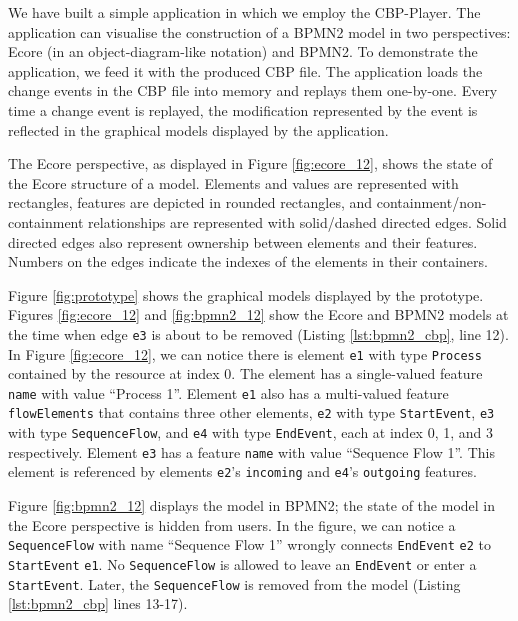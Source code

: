 \documentclass[conference]{IEEEtran}
\begin{document}
We have built a simple application in which we employ the CBP-Player. 
The application can visualise the construction of a BPMN2 model in two perspectives: Ecore (in an object-diagram-like notation) and BPMN2. 
To demonstrate the application, we feed it with the produced CBP file.
The application loads the change events in the CBP file into memory and replays them one-by-one. Every time a change event is replayed, the modification represented by the event is reflected in the graphical models displayed by the application. 

The Ecore perspective, as displayed in Figure \ref{fig:ecore_12}, shows the state of the Ecore structure of a model. Elements and values are represented with rectangles, features are depicted in rounded rectangles, and containment/non-containment relationships are represented with solid/dashed directed edges. Solid directed edges also represent ownership between elements and their features. Numbers on the edges indicate the indexes of the elements in their containers. 

Figure \ref{fig:prototype} shows the graphical models displayed by the prototype. Figures \ref{fig:ecore_12} and \ref{fig:bpmn2_12} show the Ecore and BPMN2 models at the time when edge \texttt{e3} is about to be removed (Listing \ref{lst:bpmn2_cbp}, line 12). In Figure \ref{fig:ecore_12}, we can notice there is element \texttt{e1} with type \texttt{Process} contained by the resource at index 0. The element has a single-valued feature \texttt{name} with value ``Process 1''. Element \texttt{e1} also has a multi-valued feature \texttt{flowElements} that contains three other elements, \texttt{e2} with type \texttt{StartEvent}, \texttt{e3} with type \texttt{SequenceFlow}, and \texttt{e4} with type \texttt{EndEvent}, each at index 0, 1, and 3 respectively. Element \texttt{e3} has a feature \texttt{name} with value ``Sequence Flow 1''. This element is referenced by elements \texttt{e2}'s \texttt{incoming} and \texttt{e4}'s \texttt{outgoing} features.  

Figure \ref{fig:bpmn2_12} displays the model in BPMN2; the state of the model in the Ecore perspective is hidden from users. In the figure, we can notice a \texttt{SequenceFlow} with name ``Sequence Flow 1'' wrongly connects \texttt{EndEvent} \texttt{e2} to \texttt{StartEvent} \texttt{e1}. No \texttt{SequenceFlow} is allowed to leave an \texttt{EndEvent} or enter a \texttt{StartEvent}. Later, the \texttt{SequenceFlow} is removed from the model (Listing \ref{lst:bpmn2_cbp} lines 13-17).          
\end{document}
